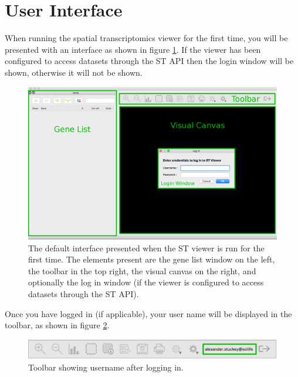 \documentclass[10pt,a4paper,titlepage]{book}
\begin{document}
\section{User Interface}
 When running the spatial transcriptomics viewer for the first time, you will be presented with an interface as shown in figure \ref{fig:default_view}. If the viewer has been configured to access datasets through the ST API then the login window will be shown, otherwise it will not be shown.
\begin{figure}[h]
	\centering
	\includegraphics[width=0.9\linewidth]{./Pictures/default_logged_out_labelled}
	\caption[The spatial transcriptomics viewer default interface]{The default interface presented when the ST viewer is run for the first time. The elements present are the gene list window on the left, the toolbar in the top right, the visual canvas on the right, and optionally the log in window (if the viewer is configured to access datasets through the ST API).}
	\label{fig:default_view}

\end{figure}

Once you have logged in (if applicable), your user name will be displayed in the toolbar, as shown in figure \ref{fig:user_name}.
\begin{figure}[h]
	\centering
	\includegraphics[width=0.9\linewidth]{./Pictures/logged_in}
	\caption{Toolbar showing username after logging in.}
	\label{fig:user_name}
\end{figure}
\end{document}
